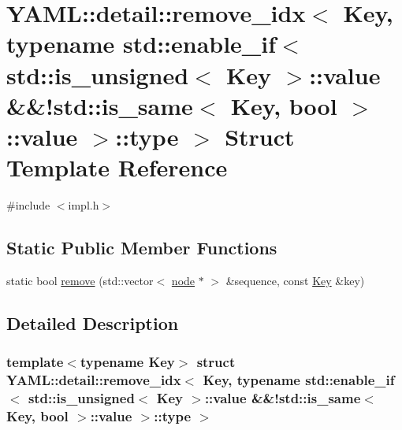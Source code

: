 \hypertarget{struct_y_a_m_l_1_1detail_1_1remove__idx_3_01_key_00_01typename_01std_1_1enable__if_3_01std_1_1is35fbbe9db9bd491994160c565f84eb78}{}\section{Y\+A\+ML\+::detail\+::remove\+\_\+idx$<$ Key, typename std\+::enable\+\_\+if$<$ std\+::is\+\_\+unsigned$<$ Key $>$\+::value \&\&!std\+::is\+\_\+same$<$ Key, bool $>$\+::value $>$\+::type $>$ Struct Template Reference}
\label{struct_y_a_m_l_1_1detail_1_1remove__idx_3_01_key_00_01typename_01std_1_1enable__if_3_01std_1_1is35fbbe9db9bd491994160c565f84eb78}


{\ttfamily \#include $<$impl.\+h$>$}

\subsection*{Static Public Member Functions}
\begin{DoxyCompactItemize}
\item 
static bool \mbox{\hyperlink{struct_y_a_m_l_1_1detail_1_1remove__idx_3_01_key_00_01typename_01std_1_1enable__if_3_01std_1_1is35fbbe9db9bd491994160c565f84eb78_a93fc34a71dc2dc338f9ebdd23f9e5bab}{remove}} (std\+::vector$<$ \mbox{\hyperlink{class_y_a_m_l_1_1detail_1_1node}{node}} $\ast$ $>$ \&sequence, const \mbox{\hyperlink{namespace_y_a_m_l_a67c320aa50d3de7ecba1d0b8775dd684a1af533fc24b0311b8c4d5ac2870283aa}{Key}} \&key)
\end{DoxyCompactItemize}


\subsection{Detailed Description}
\subsubsection*{template$<$typename Key$>$\newline
struct Y\+A\+M\+L\+::detail\+::remove\+\_\+idx$<$ Key, typename std\+::enable\+\_\+if$<$ std\+::is\+\_\+unsigned$<$ Key $>$\+::value \&\&!std\+::is\+\_\+same$<$ Key, bool $>$\+::value $>$\+::type $>$}



